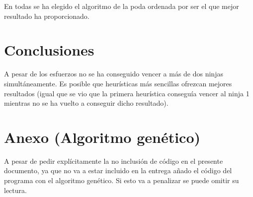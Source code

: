 \documentclass[12pt]{article}
\begin{document}
    En todas se ha elegido el algoritmo de la poda ordenada por ser el que mejor resultado ha proporcionado.
    
    \section{Conclusiones}
    A pesar de los esfuerzos no se ha conseguido vencer a más de dos ninjas simultáneamente. Es posible que heurísticas más sencillas ofrezcan mejores resultados (igual que se vio que la primera heurística conseguía vencer al ninja 1 mientras no se ha vuelto a conseguir dicho resultado).

    \section{Anexo (Algoritmo genético)}
    A pesar de pedir explícitamente la no inclusión de código en el presente documento, ya que no va a estar incluido en la entrega añado el código del programa con el algoritmo genético. Si esto va a penalizar se puede omitir su lectura.
\end{document}
